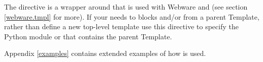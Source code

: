 The  directive is a wrapper around
 that is used with Webware and {\bf
  } (see section \ref{webware.tmpl} for more). If your
 needs to  blocks and/or 
from a parent Template, rather than define a new top-level template use this
directive to specify the Python module or  that
contains the parent Template.


Appendix \ref{examples} contains extended examples of how  is
used.


